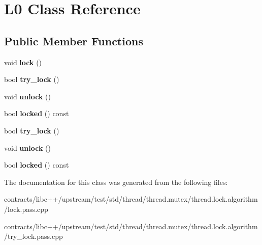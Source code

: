 \hypertarget{class_l0}{}\section{L0 Class Reference}
\label{class_l0}
\subsection*{Public Member Functions}
\begin{DoxyCompactItemize}
\item 
\mbox{\label{class_l0_a04fe668e3fd35f02ec68c29b420b887f}} 
void {\bfseries lock} ()
\item 
\mbox{\label{class_l0_abb6678113edf55e4d32d9b8908949bc6}} 
bool {\bfseries try\+\_\+lock} ()
\item 
\mbox{\label{class_l0_ab0513136318daea5dfdf6213e6eab5f2}} 
void {\bfseries unlock} ()
\item 
\mbox{\label{class_l0_aab8d5fa2fcd8232e327d525a2dc2d3f1}} 
bool {\bfseries locked} () const
\item 
\mbox{\label{class_l0_abb6678113edf55e4d32d9b8908949bc6}} 
bool {\bfseries try\+\_\+lock} ()
\item 
\mbox{\label{class_l0_ab0513136318daea5dfdf6213e6eab5f2}} 
void {\bfseries unlock} ()
\item 
\mbox{\label{class_l0_aab8d5fa2fcd8232e327d525a2dc2d3f1}} 
bool {\bfseries locked} () const
\end{DoxyCompactItemize}


The documentation for this class was generated from the following files\+:\begin{DoxyCompactItemize}
\item 
contracts/libc++/upstream/test/std/thread/thread.\+mutex/thread.\+lock.\+algorithm/lock.\+pass.\+cpp\item 
contracts/libc++/upstream/test/std/thread/thread.\+mutex/thread.\+lock.\+algorithm/try\+\_\+lock.\+pass.\+cpp\end{DoxyCompactItemize}
